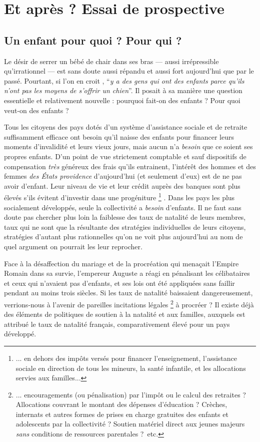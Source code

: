 

\part{Et après ? Essai de prospective}


\chapter{Un enfant pour quoi ? Pour qui ?}


Le désir de serrer un bébé de chair dans ses bras --- aussi irrépressible qu'irrationnel --- est sans doute aussi répandu et aussi fort aujourd'hui que par le passé. Pourtant, si l'on en croit , \enquote{\emph{y a des gens qui ont des enfants parce qu'ils n'ont pas les moyens de s'offrir un chien}}. Il posait à sa manière une question essentielle et relativement nouvelle : pourquoi fait-on des enfants ? Pour quoi veut-on des enfants ?

 Tous les citoyens des pays dotés d'un système d'assistance sociale et de retraite suffisamment efficace ont besoin qu'il naisse des enfants pour financer leurs moments d'invalidité et leurs vieux jours, mais aucun n'a \emph{besoin} que ce soient ses propres enfants. D'un point de vue strictement comptable et sauf dispositifs de compensation \emph{très}  généreux des frais qu'ils entrainent, l'intérêt des hommes et des femmes \emph{des États providence} d'aujourd'hui (et seulement d'eux) est de ne pas avoir d'enfant. Leur niveau de vie et leur crédit auprès des banques sont plus élevés s'ils évitent d'investir dans une progéniture%
\footnote{... en dehors des impôts versés pour financer l'enseignement, l'assistance sociale en direction de tous les mineurs, la santé infantile, et les allocations servies aux familles...}%
. Dans les pays les plus socialement développés, seule la collectivité a \emph{besoin} d'enfants. Il ne faut sans doute pas chercher plus loin la faiblesse des taux de natalité de leurs membres, taux qui ne sont que la résultante des stratégies individuelles de leurs citoyens, stratégies d'autant plus rationnelles qu'on ne voit plus aujourd'hui au nom de quel argument on pourrait les leur reprocher. 
 
 Face à la désaffection du mariage et de la procréation qui menaçait l'Empire Romain dans sa survie, l'empereur Auguste a réagi en pénalisant les célibataires et ceux qui n'avaient pas d'enfants, et ses lois ont été appliquées sans faillir pendant au moins trois siècles. Si les taux de natalité baissaient dangereusement, verrions-nous à l'avenir de pareilles incitations légales%
\footnote{... encouragements (ou pénalisation) par l'impôt ou le calcul des retraites ? Allocations couvrant le montant des dépenses d'éducation ? Crèches, internats et autres formes de prises en charge gratuites des enfants et adolescents par la collectivité ? Soutien matériel direct aux jeunes majeurs \emph{sans} conditions de ressources parentales ?~etc.} 
à procréer ? Il existe déjà des éléments de politiques de soutien à la natalité et aux familles, auxquels est attribué le taux de natalité français, comparativement élevé pour un pays développé.
 
